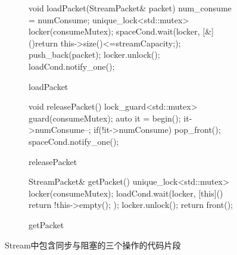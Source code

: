 \begin{figure}[!htp]
  \centering
  \begin{subfigure}{0.32\textwidth}
    \centering
    
\begin{codeblock}[language=C, basicstyle=\ttfamily\tiny]
void loadPacket(StreamPacket& packet) 
{
    num_consume = numConsume;
    unique_lock<std::mutex> locker(consumeMutex);
    spaceCond.wait(locker, [&](){return this->size()<=streamCapacity;});
    push_back(packet);
    locker.unlock();
    loadCond.notify_one();
}
\end{codeblock}

    \caption{loadPacket}
  \end{subfigure}
  \begin{subfigure}{0.32\textwidth}
    \centering
    
\begin{codeblock}[language=C, basicstyle=\ttfamily\tiny]
void releasePacket()
{
    {
        lock_guard<std::mutex> guard(consumeMutex);
        auto it = begin();
        it->numConsume--;
        if(!it->numConsume)
            pop_front();
    }
    spaceCond.notify_one();
}
\end{codeblock}

    \caption{releasePacket}
  \end{subfigure}
  \begin{subfigure}{0.32\textwidth}
    \centering
    
\begin{codeblock}[language=C, basicstyle=\ttfamily\tiny]
StreamPacket& getPacket()
{
    unique_lock<std::mutex> locker(consumeMutex);
    loadCond.wait(locker, [this](){ 
        return !this->empty();
    });
    locker.unlock();
    return front();
}
\end{codeblock}

    \caption{getPacket}
  \end{subfigure}
  
  \caption{Stream中包含同步与阻塞的三个操作的代码片段}
  \label{fig:stream_code}
\end{figure}

